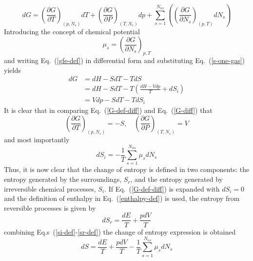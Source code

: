 \documentclass[a4paper]{article}
\newcommand{\eref}[1]{Eq.~(\ref{#1})}
\newcommand{\erefs}[2]{Eq.s~(\ref{#1}-\ref{#2})}
\newcommand{\pd}[2]{\frac{\partial #1}{\partial #2}}
\begin{document}
\begin{enumerate}
    \begin{equation}
      dG = \left( \pd{G}{T} \right)_{(p,N_s)} dT
      + \left( \pd{G}{P} \right)_{(T,N_s)} dp
      + \sum\limits_{s=1}^{N_{ns}}{\left( \left( \pd{G}{N_s}
      \right)_{(p,T)} dN_s\right)}
      \label{G-diff}
    \end{equation}
    Introducing the concept of chemical potential
    \begin{equation}
      \mu_s = \left( \frac{\partial G}{\partial N_s} \right)_{p,T}
      \label{mu-def}
    \end{equation}
    and writing \eref{gfe-def} in differential form and substituting
    \eref{s-one-gas} yields
    \begin{equation}
      \begin{aligned}
        dG &= dH - SdT - TdS \\
	         &= dH - SdT - T\left( \frac{dH - Vdp}{T} + dS_i \right) \\
	         &= Vdp - SdT - TdS_i
      \end{aligned}
      \label{G-def-diff}
    \end{equation}
    It is clear that in comparing \eref{G-def-diff} and \eref{G-diff} that
    \begin{equation}
      \left( \pd{G}{T} \right)_{(p,N_s)} = -S, \quad
      \left( \pd{G}{P} \right)_{(T,N_s)} = V
      \label{G-derivs}
    \end{equation}
    and most importantly
    \begin{equation}
      dS_i = -\frac{1}{T}\sum\limits_{s=1}^{N_{ns}}{\mu_s dN_s}
      \label{si-def}
    \end{equation}
    Thus, it is now clear that the change of entropy is defined in two
    components: the entropy generated by the surroundings, $S_r$, and the
    entropy generated by irreversible chemical processes, $S_i$.  If
    \eref{G-def-diff} is expanded with $dS_i = 0$ and the definition of
    enthalpy in \eref{enthalpy-def} is used, the entropy from reversible
    processes is given
    by
    \begin{equation}
      dS_r = \frac{dE}{T} + \frac{pdV}{T}
      \label{sr-def}
    \end{equation}
    combining \erefs{si-def}{sr-def} the change of entropy expression is
    obtained
    \begin{equation}
      \boxed{dS = \frac{dE}{T} + \frac{pdV}{T} 
      -\frac{1}{T}\sum\limits_{s=1}^{N_{ns}}{\mu_s dN_s}}
      \label{ds-final}
    \end{equation}
    

\end{enumerate}
\end{document}
